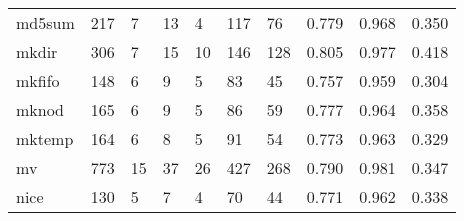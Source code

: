 \begin{longtable}{lp{2.0cm}p{2.0cm}p{2.0cm}p{2.0cm}p{2.0cm}p{2.0cm}p{2.0cm}p{2.0cm}p{2.0cm}}
md5sum    &                    217 &                                  7 &                                13 &                                4 &                               117 &                              76 &                                   0.779 &                                  0.968 &                                0.350 \\
mkdir     &                    306 &                                  7 &                                15 &                               10 &                               146 &                             128 &                                   0.805 &                                  0.977 &                                0.418 \\
mkfifo    &                    148 &                                  6 &                                 9 &                                5 &                                83 &                              45 &                                   0.757 &                                  0.959 &                                0.304 \\
mknod     &                    165 &                                  6 &                                 9 &                                5 &                                86 &                              59 &                                   0.777 &                                  0.964 &                                0.358 \\
mktemp    &                    164 &                                  6 &                                 8 &                                5 &                                91 &                              54 &                                   0.773 &                                  0.963 &                                0.329 \\
mv        &                    773 &                                 15 &                                37 &                               26 &                               427 &                             268 &                                   0.790 &                                  0.981 &                                0.347 \\
nice      &                    130 &                                  5 &                                 7 &                                4 &                                70 &                              44 &                                   0.771 &                                  0.962 &                                0.338 \\

\end{longtable}
